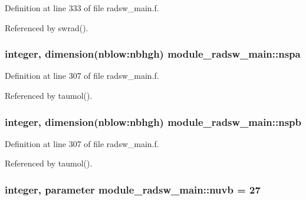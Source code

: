 Definition at line 333 of file radsw\+\_\+main.\+f.



Referenced by swrad().

\subsubsection[{\texorpdfstring{nspa}{nspa}}]{\setlength{\rightskip}{0pt plus 5cm}integer, dimension(nblow\+:nbhgh) module\+\_\+radsw\+\_\+main\+::nspa\hspace{0.3cm}{\ttfamily [private]}}\hypertarget{namespacemodule__radsw__main_a4c0fc140a51c619089128f52e4bb878c}{}\label{namespacemodule__radsw__main_a4c0fc140a51c619089128f52e4bb878c}


Definition at line 307 of file radsw\+\_\+main.\+f.



Referenced by taumol().

\subsubsection[{\texorpdfstring{nspb}{nspb}}]{\setlength{\rightskip}{0pt plus 5cm}integer, dimension(nblow\+:nbhgh) module\+\_\+radsw\+\_\+main\+::nspb\hspace{0.3cm}{\ttfamily [private]}}\hypertarget{namespacemodule__radsw__main_a6be022a4a1ae32248d9721a9fff93db6}{}\label{namespacemodule__radsw__main_a6be022a4a1ae32248d9721a9fff93db6}


Definition at line 307 of file radsw\+\_\+main.\+f.



Referenced by taumol().

\subsubsection[{\texorpdfstring{nuvb}{nuvb}}]{\setlength{\rightskip}{0pt plus 5cm}integer, parameter module\+\_\+radsw\+\_\+main\+::nuvb = 27\hspace{0.3cm}{\ttfamily [private]}}\hypertarget{namespacemodule__radsw__main_a177282b3087dce2f54f1233ee8631231}{}\label{namespacemodule__radsw__main_a177282b3087dce2f54f1233ee8631231}


